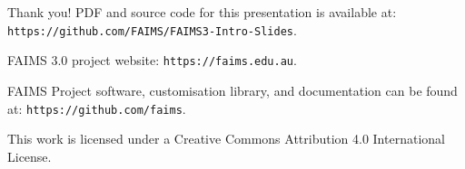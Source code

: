 
\begin{frame}{Thank you!}
PDF and source code for this presentation is available at: 
\texttt{https://github.com/FAIMS/FAIMS3-Intro-Slides}.

FAIMS 3.0 project website: \texttt{https://faims.edu.au}.

FAIMS Project software, customisation library, and documentation can be found at:
\texttt{https://github.com/faims}.


This work is licensed under a Creative Commons Attribution 4.0 International License.

\end{frame}